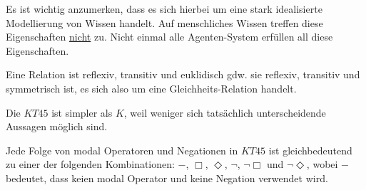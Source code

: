 Es ist wichtig anzumerken, dass es sich hierbei um eine stark idealisierte Modellierung von Wissen handelt.
Auf menschliches Wissen treffen diese Eigenschaften \underline{nicht} zu.
Nicht einmal alle Agenten-System erfüllen all diese Eigenschaften. 


\begin{fact}
	Eine Relation ist reflexiv, transitiv und euklidisch gdw. sie reflexiv, transitiv und symmetrisch ist, es sich also um eine Gleichheits-Relation handelt. 
\end{fact}

Die \ML $KT45$ ist simpler als $K$, weil weniger sich tatsächlich unterscheidende Aussagen möglich sind.

\begin{theorem}
	Jede Folge von modal Operatoren und Negationen in $KT45$ ist gleichbedeutend zu einer der folgenden Kombinationen: $-$, $\Box$, $\Diamond$, $\neg$, $\neg \Box$ und $\neg \Diamond$, wobei $-$ bedeutet, dass keien modal Operator und keine Negation verwendet wird. 
\end{theorem}


